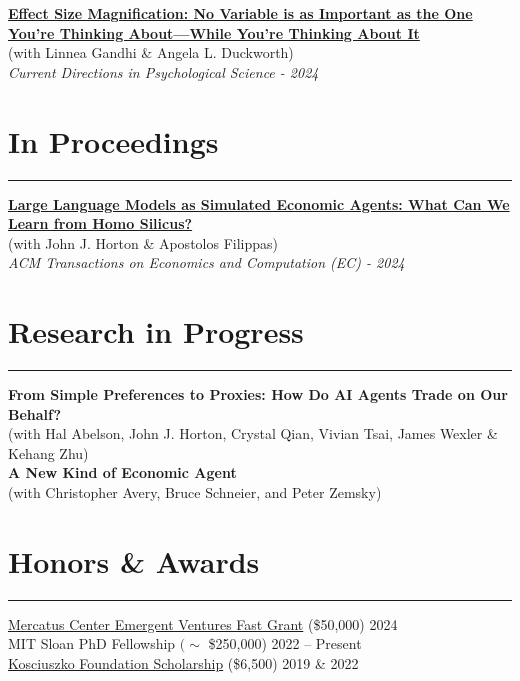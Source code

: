 \documentclass[11.25pt]{article}
\begin{document}
\noindent \textbf{\href{https://journals.sagepub.com/doi/full/10.1177/09637214241268222}{Effect Size Magnification: No Variable is as Important as the One You’re Thinking About—While You’re Thinking About It}} \\
(with Linnea Gandhi \& Angela L. Duckworth)\\
\textit{Current Directions in Psychological Science - 2024}

\newpage \clearpage

\section*{In Proceedings} \vspace{-1mm} \hrule
\vspace{3mm}
\href{https://dl.acm.org/doi/10.1145/3670865.3673513}{\textbf{Large Language Models as Simulated Economic Agents: What Can We Learn from Homo Silicus?}} \\ (with John J. Horton \& Apostolos Filippas) \\ \textit{ACM Transactions on Economics and Computation (EC) - 2024}

\section*{Research in Progress} \vspace{-1mm} \hrule
\vspace{3mm}

\noindent\textbf{From Simple Preferences to Proxies: How Do AI Agents Trade on Our Behalf?}\\ 
(with Hal Abelson, John J. Horton, Crystal Qian, Vivian Tsai, James Wexler \& Kehang Zhu)\\

\noindent\textbf{A New Kind of Economic Agent}\\ 
(with Christopher Avery, Bruce Schneier, and Peter Zemsky)\\

\section*{Honors \& Awards} \hrule
\vspace{3mm}
\href{https://www.mercatus.org/emergent-ventures}{Mercatus Center Emergent Ventures Fast Grant} (\$50,000) \hfill 2024\\
MIT Sloan PhD Fellowship $(\sim$ \$250,000) \hfill 2022 -- Present\\
\href{https://thekf.org/scholarship/tuition-scholarships/}{Kosciuszko Foundation Scholarship} (\$6,500) \hfill 2019 \& 2022\\
\end{document}
